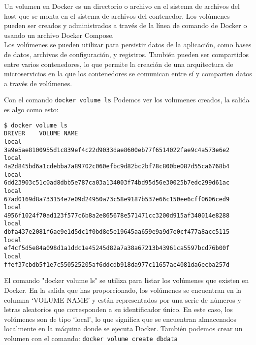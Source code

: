 \documentclass{article}
\begin{document}
Un volumen en Docker es un directorio o archivo en el sistema de archivos del host que se monta en el sistema de archivos del contenedor. Los volúmenes pueden ser creados y administrados a través de la línea de comando de Docker o usando un archivo Docker Compose.\\

Los volúmenes se pueden utilizar para persistir datos de la aplicación, como bases de datos, archivos de configuración, y registros. También pueden ser compartidos entre varios contenedores, lo que permite la creación de una arquitectura de microservicios en la que los contenedores se comunican entre sí y comparten datos a través de volúmenes.

Con el comando \lstinline{docker volume ls} Podemos ver los volumenes creados, la salida es algo como esto:
\begin{lstlisting}[numbers=none]
$ docker volume ls
DRIVER    VOLUME NAME
local     3a9e5ae8100955d1c839ef4c22d9033dae8600eb77f6514022fae9c4a573e6e2
local     4a2d845bd6a1cdebba7a89702c060efbc9d82bc2bf78c800be087d55ca6768b4
local     6dd23903c51c0ad8dbb5e787ca03a134003f74bd95d56e30025b7edc299d61ac
local     67ad0169d8a733154e7e09d24950a73c58e9187b537e66c150ee6cff0606ced9
local     4956f1024f70ad123f577c6b8a2e865678e571471cc3200d915af340014e8288
local     dbfa437e2081f6ae9e1d5dc1f0bd8e5e19645aa659e9a9d7e0cf477a8acc5115
local     ef4cf5d5e84a098d1a1ddc1e45245d82a7a38a67213b43961ca5597bcd76b00f
local     ffef37cbdb5f1e7c550525205af6ddcdb918da977c11657ac4081da6ecba257d   
\end{lstlisting}

El comando "docker volume ls" se utiliza para listar los volúmenes que existen en Docker. En la salida que has proporcionado, los volúmenes se encuentran en la columna \enquote*{VOLUME NAME} y están representados por una serie de números y letras aleatorios que corresponden a su identificador único. En este caso, los volúmenes son de tipo \enquote*{local}, lo que significa que se encuentran almacenados localmente en la máquina donde se ejecuta Docker. También podemos crear un volumen con el comando: \lstinline{docker volume create dbdata}
\end{document}
